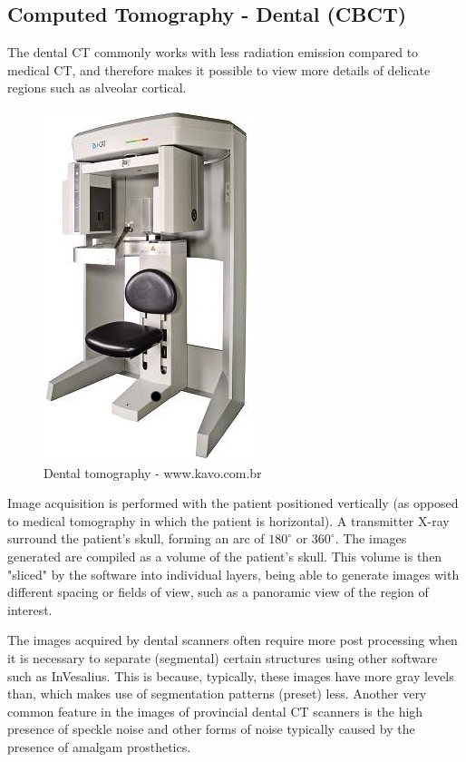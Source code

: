 \subsection{Computed Tomography - Dental (CBCT)}

The dental CT commonly works with less radiation emission compared to medical CT, and therefore makes it possible to view more details of delicate regions such as alveolar cortical.

\begin{figure}[!htb]
\centering
\includegraphics[scale=0.4]{../user_guide_figures/feixe_conico.jpg}
\caption{Dental tomography - www.kavo.com.br}
\end{figure}

Image acquisition is performed with the patient positioned vertically (as opposed to medical tomography in which the patient is horizontal). A transmitter X-ray surround the patient's skull, forming an arc of $180^\circ$ or $360^\circ$. The images generated are compiled as a volume of the patient's skull. This volume is then "sliced" by the software into individual layers, being able to generate images with different spacing or fields of view, such as a panoramic view of the region of interest.

The images acquired by dental scanners often require more post processing when it is necessary to separate (segmental) certain structures using other software such as InVesalius. This is because, typically, these images have more gray levels than, which makes use of segmentation patterns (preset) less. Another very common feature in the images of provincial dental CT scanners is the high presence of speckle noise and other forms of noise typically caused by the presence of amalgam prosthetics.

